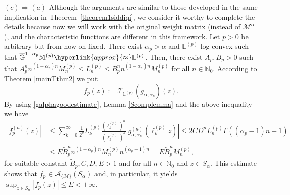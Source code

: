 \documentclass[11pt,a4paper]{article}
\theoremstyle{plain}
\theoremstyle{definition}
\newcommand{\NN}{\mathbb{N}}
\newcommand{\red}[1]{{\color{red}#1}}
\newcommand{\M}{\mathbb{M}}
\newcommand{\LL}{\mathbb{L}}
\newcommand{\G}{\mathbb{G}}
\begin{document}
$(c)\Rightarrow(a)$ {Although the arguments are similar to those developed in the same implication in Theorem~\ref{theorem1siddiqi}, we consider it worthy to complete the details because now we will work with the original weight matrix (instead of $\mathcal{M}^\alpha$), and the characteristic functions are different in this framework.
}
Let $p>0$ be arbitrary but from now on fixed. There exist  $\alpha_p>\alpha$ and $ \LL^{(p)} $ log-convex such that $\overline{\G}^{1-\alpha_p}\M^{(p)}\hyperlink{approx}{\approx} \LL^{(p)}$. Then, there exist $A_p,B_p>0$ such that $A_p^n n^{(1-\alpha_p)n}M^{(p)}_n\le L^{(p)}_n \le B_p^n n^{(1-\alpha_p)n}M^{(p)}_n  $ for all $n\in\NN_{0}$. According to Theorem \ref{mainTthm2} we put
\begin{equation*}%
	f_{p}(z):=\mathcal{T}_{\LL^{(p)}} (g_{\alpha,\alpha_p})(z).%
\end{equation*}
By using \eqref{galphagoodestimate}, Lemma \ref{Scomplemma} and the above inequality we have
\begin{align*}
	|f^{(n)}_{p}(z)|&\le\sum_{k= 0}^\infty\frac{1}{2^k}L^{(p)}_k\frac{(\ell^{(p)}_{k})^n}{(\ell^{(p)}_{k})^k}|g_{\alpha,\alpha_p}^{(n)}(\ell^{(p)}_{k}z)|\le 2CD^nL^{(p)}_n\Gamma((\alpha_p-1)n+1)\\&
	\le E\widetilde{B}_p^nn^{(1-\alpha_p)n}M^{(p)}_nn^{(\alpha_p-1)n}= E\widetilde{B}_p^nM^{(p)}_n,
\end{align*}
%
for suitable constant $\widetilde{B}_p,C,D,E>1$ and for all $n\in\NN_0$ and $z\in S_{\alpha}$.
This estimate shows that $f_{p}\in\mathcal{A}_{\{\mathcal{M}\}}(S_{\alpha})$ and, in particular, it yields $\sup_{z\in S_{\alpha}}|f_{p}(z)|\leq E<+\infty$.
\end{document}
